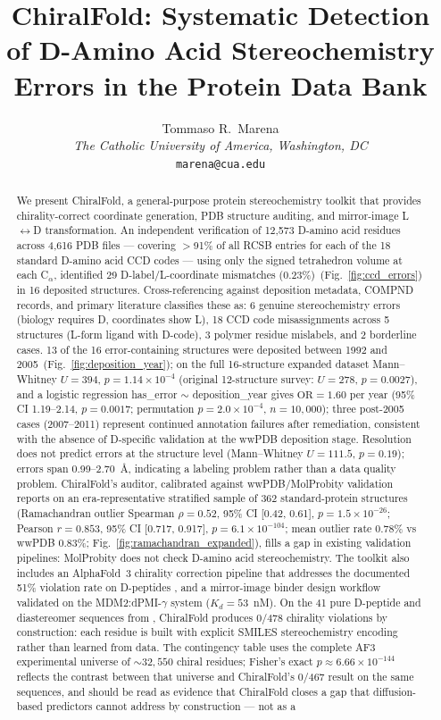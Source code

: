 \documentclass[11pt]{article}
\title{ChiralFold: Systematic Detection of D-Amino Acid Stereochemistry Errors in the Protein Data Bank}
\author{Tommaso R.\ Marena\\
\textit{The Catholic University of America, Washington, DC}\\
\texttt{marena@cua.edu}}
\date{}
\begin{document}
\maketitle

\begin{abstract}
We present ChiralFold, a general-purpose protein stereochemistry toolkit that provides chirality-correct coordinate generation, PDB structure auditing, and mirror-image L$\leftrightarrow$D transformation. An independent verification of 12,573 D-amino acid residues across 4,616 PDB files --- covering $>$91\% of all RCSB entries for each of the 18 standard D-amino acid CCD codes --- using only the signed tetrahedron volume at each C$_\alpha$, identified 29 D-label/L-coordinate mismatches (0.23\%)~(Fig.~\ref{fig:ccd_errors}) in 16 deposited structures. Cross-referencing against deposition metadata, COMPND records, and primary literature classifies these as: 6 genuine stereochemistry errors (biology requires D, coordinates show L), 18 CCD code misassignments across 5 structures (L-form ligand with D-code), 3 polymer residue mislabels, and 2 borderline cases. 13 of the 16 error-containing structures were deposited between 1992 and 2005~(Fig.~\ref{fig:deposition_year}); on the full 16-structure expanded dataset Mann--Whitney $U=394$, $p=1.14\times10^{-4}$ (original 12-structure survey: $U=278$, $p=0.0027$), and a logistic regression has\_error $\sim$ deposition\_year gives $\mathrm{OR}=1.60$ per year (95\% CI 1.19--2.14, $p=0.0017$; permutation $p=2.0\times10^{-4}$, $n=10{,}000$); three post-2005 cases (2007--2011) represent continued annotation failures after remediation, consistent with the absence of D-specific validation at the wwPDB deposition stage. Resolution does not predict errors at the structure level (Mann--Whitney $U=111.5$, $p=0.19$); errors span 0.99--2.70~\AA, indicating a labeling problem rather than a data quality problem. ChiralFold's auditor, calibrated against wwPDB/MolProbity validation reports on an era-representative stratified sample of 362 standard-protein structures (Ramachandran outlier Spearman $\rho=0.52$, 95\% CI [0.42, 0.61], $p=1.5\times10^{-26}$; Pearson $r=0.853$, 95\% CI [0.717, 0.917], $p=6.1\times10^{-104}$; mean outlier rate 0.78\% vs wwPDB 0.83\%; Fig.~\ref{fig:ramachandran_expanded}), fills a gap in existing validation pipelines: MolProbity does not check D-amino acid stereochemistry. The toolkit also includes an AlphaFold~3 chirality correction pipeline that addresses the documented 51\% violation rate on D-peptides \citep{childs2025}, and a mirror-image binder design workflow validated on the MDM2:dPMI-$\gamma$ system ($K_d=53$~nM). On the 41 pure D-peptide and diastereomer sequences from \citet{childs2025}, ChiralFold produces 0/478 chirality violations by construction: each residue is built with explicit SMILES stereochemistry encoding rather than learned from data. The contingency table uses the complete \citet{childs2025} AF3 experimental universe of ${\sim}32{,}550$ chiral residues; Fisher's exact $p \approx 6.66 \times 10^{-144}$ reflects the contrast between that universe and ChiralFold's 0/467 result on the same sequences, and should be read as evidence that ChiralFold closes a gap that diffusion-based predictors cannot address by construction --- not as a 
\end{abstract}
\end{document}
